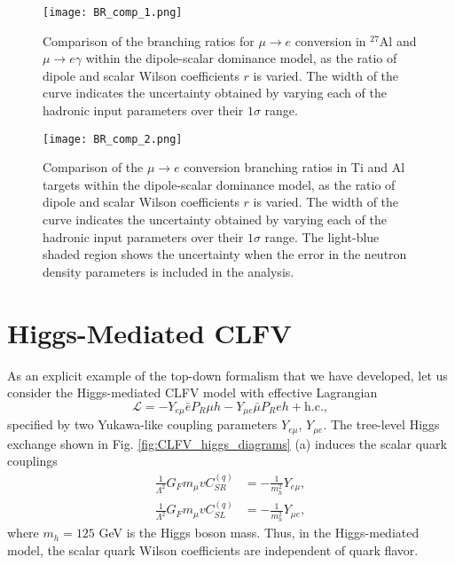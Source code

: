 \documentclass{book}[letterpaper,12pt]
\begin{document}
\begin{figure}
\centering
\texttt{[image: BR\_comp\_1.png]}
\caption{Comparison of the branching ratios for $\mu\rightarrow e$ conversion in $^{27}$Al and $\mu\rightarrow e\gamma$ within the dipole-scalar dominance model, as the ratio of dipole and scalar Wilson coefficients $r$ is varied. The width of the curve indicates the uncertainty obtained by varying each of the hadronic input parameters over their $1\sigma$ range.}
\label{fig:BR_comp_1}
\end{figure}

\begin{figure}
\centering
\texttt{[image: BR\_comp\_2.png]}
\caption{Comparison of the $\mu\rightarrow e$ conversion branching ratios in Ti and Al targets within the dipole-scalar dominance model, as the ratio of dipole and scalar Wilson coefficients $r$ is varied. The width of the curve indicates the uncertainty obtained by varying each of the hadronic input parameters over their $1\sigma$ range. The light-blue shaded region shows the uncertainty when the error in the neutron density parameters is included in the analysis.}
\label{fig:BR_comp_2}
\end{figure}


\section{Higgs-Mediated CLFV}
\label{sec:CLFV_higgs}
As an explicit example of the top-down formalism that we have developed, let us consider the Higgs-mediated CLFV model with effective Lagrangian
\begin{equation}
\mathcal{L}=-Y_{e\mu}\bar{e}P_R\mu h-Y_{\mu e}\bar{\mu}P_Reh+\mathrm{h.c.},
\label{eq:L_higgs}
\end{equation}
specified by two Yukawa-like coupling parameters $Y_{e\mu}$, $Y_{\mu e}$. The tree-level Higgs exchange shown in Fig. \ref{fig:CLFV_higgs_diagrams} (a) induces the scalar quark couplings
\begin{equation}
\begin{split}
\frac{1}{\Lambda^2}G_Fm_{\mu}vC^{(q)}_{SR}&=-\frac{1}{m_h^2}Y_{e\mu},\\
\frac{1}{\Lambda^2}G_Fm_{\mu}vC_{SL}^{(q)}&=-\frac{1}{m_h^2}Y_{\mu e},
\end{split}
\end{equation}
where $m_h=125$ GeV is the Higgs boson mass. Thus, in the Higgs-mediated model, the scalar quark Wilson coefficients are independent of quark flavor. 
\end{document}
